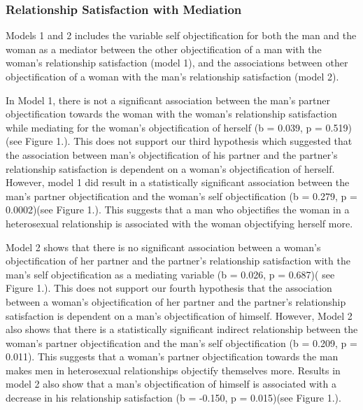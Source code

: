 \documentclass[
  english,
  man,floatsintext]{apa6}
\begin{document}
\hypertarget{relationship-satisfaction-with-mediation}{%
\subsubsection{Relationship Satisfaction with Mediation}\label{relationship-satisfaction-with-mediation}}

Models 1 and 2 includes the variable self objectification for both the man and the woman as a mediator between the other objectification of a man with the woman's relationship satisfaction (model 1), and the associations between other objectification of a woman with the man's relationship satisfaction (model 2).

In Model 1, there is not a significant association between the man's partner objectification towards the woman with the woman's relationship satisfaction while mediating for the woman's objectification of herself (b = 0.039, p = 0.519)(see Figure 1.). This does not support our third hypothesis which suggested that the association between man's objectification of his partner and the partner's relationship satisfaction is dependent on a woman's objectification of herself. However, model 1 did result in a statistically significant association between the man's partner objectification and the woman's self objectification (b = 0.279, p = 0.0002)(see Figure 1.). This suggests that a man who objectifies the woman in a heterosexual relationship is associated with the woman objectifying herself more.

Model 2 shows that there is no significant association between a woman's objectification of her partner and the partner's relationship satisfaction with the man's self objectification as a mediating variable (b = 0.026, p = 0.687)( see Figure 1.). This does not support our fourth hypothesis that the association between a woman's objectification of her partner and the partner's relationship satisfaction is dependent on a man's objectification of himself. However, Model 2 also shows that there is a statistically significant indirect relationship between the woman's partner objectification and the man's self objectification (b = 0.209, p = 0.011). This suggests that a woman's partner objectification towards the man makes men in heterosexual relationships objectify themselves more. Results in model 2 also show that a man's objectification of himself is associated with a decrease in his relationship satisfaction (b = -0.150, p = 0.015)(see Figure 1.).
\end{document}
